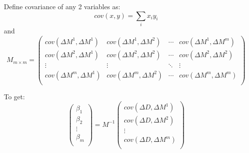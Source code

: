 Define covariance of any 2 variables as:
\begin{equation}
    cov(x, y) = \sum_i x_i y_i
\end{equation}
and
\begin{equation}
    M_{m \times m} = 
    \begin{pmatrix}
	cov(\Delta M^1, \Delta M^1) & cov(\Delta M^1, \Delta M^2)   & \cdots & cov(\Delta M^1, \Delta M^m)  \\
	cov(\Delta M^2, \Delta M^1) & cov(\Delta M^2, \Delta M^2)   & \cdots & cov(\Delta M^2, \Delta M^2)  \\
	\vdots	& \vdots    & \ddots	& \vdots    \\
	cov(\Delta M^m, \Delta M^1) & cov(\Delta M^m, \Delta M^2)   & \cdots & cov(\Delta M^m, \Delta M^m)  \\
    \end{pmatrix}
\end{equation}

To get:
\begin{equation}
    \begin{pmatrix}
	\beta_1 \\
	\beta_2 \\
	\vdots	\\
	\beta_m \\ 
    \end{pmatrix}
    =
    M^{-1}
    \begin{pmatrix}
	cov(\Delta D, \Delta M^1)   \\
	cov(\Delta D, \Delta M^2)   \\
	\vdots	\\
	cov(\Delta D, \Delta M^m)   \\
    \end{pmatrix}
\end{equation}

